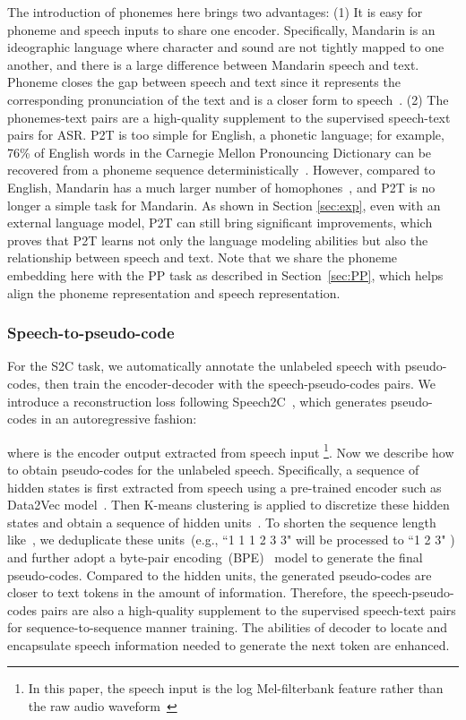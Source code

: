 \documentclass{article}
\begin{document}
The introduction of phonemes here brings two advantages: (1) It is easy for phoneme and speech inputs to share one encoder. Specifically, Mandarin is an ideographic language where character and sound are not tightly mapped to one another, and there is a large difference between Mandarin speech and text. Phoneme closes the gap between speech and text since it represents the corresponding pronunciation of the text and is a closer form to speech~\cite{Tang2021AGM,tang2022unified}. (2) The phonemes-text pairs are a high-quality supplement to the supervised speech-text pairs for ASR. 
P2T is too simple for English, a phonetic language; for example, 76\% of English words in the Carnegie Mellon Pronouncing Dictionary can be recovered from a phoneme sequence deterministically~\cite{Tang2021AGM}.
However, compared to English, Mandarin has a much larger number of homophones~\cite{zhou2015homophone}, and P2T is no longer a simple task for Mandarin. As shown in Section \ref{sec:exp}, even with an external language model, P2T can still bring significant improvements, which proves that P2T learns not only the language modeling abilities but also the relationship between speech and text.
Note that we share the phoneme embedding  here with the PP task as described in Section~\ref{sec:PP}, which helps align the phoneme representation and speech representation.

\subsubsection{Speech-to-pseudo-code}
For the S2C task, we automatically annotate the unlabeled speech with pseudo-codes, then train the encoder-decoder with the speech-pseudo-codes pairs. We introduce a reconstruction loss following Speech2C~\cite{ao2022pre}, which generates pseudo-codes  in an autoregressive fashion:

where  is the encoder output extracted from speech input \footnote{In this paper, the speech input is the log Mel-filterbank feature rather than the raw audio waveform~\cite{baevski2020wav2vec,hsu2021hubert,baevski2022data2vec}}. Now we describe how to obtain pseudo-codes for the unlabeled speech. Specifically, a sequence of hidden states is first extracted from speech using a pre-trained encoder such as Data2Vec model~\cite{baevski2022data2vec}. Then K-means clustering is applied to discretize these hidden states and obtain a sequence of hidden units~\cite{hsu2021hubert}. To shorten the sequence length like~\cite{wu2022wav2seq}, we deduplicate these units~(e.g., ``1 1 1 2 3 3" will be processed to ``1 2 3" ) 
and further adopt a byte-pair encoding~(BPE)~\cite{gage1994new} model to generate the final pseudo-codes. 
Compared to the hidden units, the generated pseudo-codes are closer to text tokens in the amount of information. 
Therefore, the speech-pseudo-codes pairs are also a high-quality supplement to the supervised speech-text pairs for sequence-to-sequence manner training. The abilities of decoder to locate and encapsulate speech information needed to generate the next token are enhanced.
\end{document}
